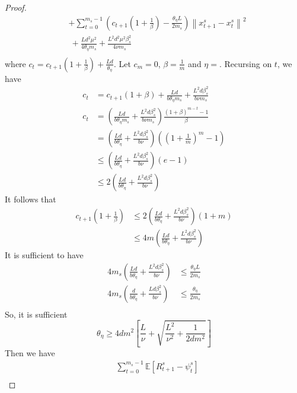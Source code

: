 \documentclass{article}
\newcommand*{\E}{\mathbb{E}}
\newcommand{\norm}[1]{\left\lVert#1\right\rVert}
\theoremstyle{definition}
\theoremstyle{remark}
\begin{document}
{\begin{proof}
\begin{equation}
\begin{split}
&+\sum_{t=0}^{m_s-1}(c_{t+1}(1+\frac{1}{\beta})-\frac{\theta_{\eta} L}{2m_s})\norm{x_{t+1}^s-x_{t}^s}^2\\
&~+\frac{Ld^2\mu^2}{4\theta_{\eta}m_s}+\frac{ L^2d^2\mu^2\beta_s^2}{4\nu m_s}\\
\end{split}
\end{equation}
where $c_t = c_{t+1}(1+\frac{1}{\beta})+\frac{Ld}{\theta_{\eta}}$. {\color{red} Let $c_m=0$, $\beta=\frac{1}{m}$ and $\eta = $}. Recursing on $t$, we have 
\begin{equation}
\begin{split}
c_t &= c_{t+1}(1+{\beta})+\frac{Ld}{b\theta_{\eta} m_s}+\frac{L^2d\beta_s^2}{b\nu m_s} \\
c_t &= (\frac{Ld}{b\theta_{\eta} m_s}+\frac{L^2d\beta_s^2}{b\nu m_s}) \frac{(1+\beta)^{m-t}-1}{\beta} \\
&= (\frac{Ld}{b\theta_{\eta}}+\frac{L^2d\beta_s^2}{b\nu })((1+\frac{1}{m})^m-1)\\
&\leq (\frac{Ld}{b\theta_{\eta} }+\frac{L^2d\beta_s^2}{b\nu })(e-1)\\
&\leq 2(\frac{Ld}{b\theta_{\eta} }+\frac{L^2d\beta_s^2}{b\nu })
\end{split}
\end{equation}
It follows that 
\begin{equation}
\begin{split}
c_{t+1}(1+\frac{1}{\beta})&\leq 2(\frac{Ld}{b\theta_{\eta} }+\frac{L^2d\beta_s^2}{b\nu })(1+m)\\
&\leq 4m(\frac{Ld}{b\theta_{\eta} }+\frac{L^2d\beta_s^2}{b\nu })
\end{split}
\end{equation}
It is sufficient to have
\begin{equation}
\begin{split}
 4m_s(\frac{Ld}{b\theta_{\eta} }+\frac{L^2d\beta_s^2}{b\nu }) &\leq \frac{\theta_{\eta} L}{2m_s}\\
  4m_s(\frac{d}{b\theta_{\eta} }+\frac{Ld\beta_s^2}{b\nu }) &\leq \frac{\theta_{\eta}}{2m_s}\\
\end{split}
\end{equation}
So, it is sufficient
\[
\theta_\eta \geq 4 dm^2 \left[ \frac{L}{\nu}+\sqrt{\frac{L^2}{\nu^2}+\frac{1}{2dm^2}}\right]
\]
Then we have 
\begin{equation}
\begin{split}
&\sum_{t=0}^{m_s-1} \E[R_{t+1}^s - \psi_{t}^s]\\

\end{split}
\end{equation}
\end{proof}}
\end{document}
